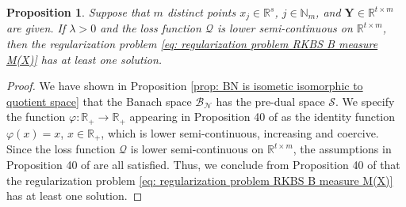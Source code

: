 \documentclass[11pt]{article}
\newtheorem{proposition}[theorem]{Proposition}
\begin{document}
\begin{proposition}\label{Existence-of-Solution}
Suppose that $m$ distinct points $x_j\in\mathbb{R}^s$, $j\in\mathbb{N}_m$, and $\mathbf{Y}\in\mathbb{R}^{t\times m}$ are given.  %
If $\lambda>0$ and the loss function $\mathcal{Q}$ is lower semi-continuous on $\mathbb{R}^{t\times m}$, then the regularization problem \eqref{eq: regularization problem RKBS B measure M(X)} has at least one solution. 
\end{proposition}
%
\begin{proof}
We have shown in Proposition \ref{prop: BN is isometic isomorphic to quotient space} that the Banach space $\mathcal{B}_{\mathcal{N}}$ has the pre-dual space $\mathcal{S}$. We specify the function $\varphi:\mathbb{R}_+\to\mathbb{R}_+$ appearing in Proposition 40 of  \cite{wang2021representer} as the identity function $\varphi(x)=x$, $x\in\mathbb{R}_+$, which is lower semi-continuous, increasing and coercive. Since the loss function $\mathcal{Q}$ is lower semi-continuous on $\mathbb{R}^{t\times m}$, the assumptions in Proposition 40 of  \cite{wang2021representer} are all satisfied. Thus, we conclude from Proposition 40 of  \cite{wang2021representer} that the regularization problem \eqref{eq: regularization problem RKBS B measure M(X)} has at least one solution.
\end{proof}
\end{document}
